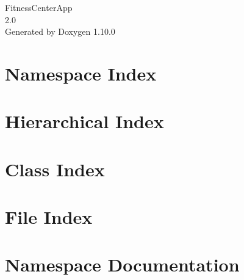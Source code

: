 \documentclass[twoside]{book}
\newcommand{\+}{\discretionary{\mbox{\scriptsize$\hookleftarrow$}}{}{}}
\newcommand{\clearemptydoublepage}{%
    \newpage{\pagestyle{empty}\cleardoublepage}%
  }
\begin{document}
  \raggedbottom
    \hypersetup{pageanchor=false,
                bookmarksnumbered=true,
                pdfencoding=unicode
               }
  \begin{titlepage}
  \vspace*{7cm}
  \begin{center}%
  {\Large Fitness\+Center\+App}\\
  [1ex]\large 2.\+0 \\
  \vspace*{1cm}
  {\large Generated by Doxygen 1.10.0}\\
  \end{center}
  \end{titlepage}
  \clearemptydoublepage
  \tableofcontents
  \clearemptydoublepage
  \hypersetup{pageanchor=true}
\chapter{Namespace Index}

\chapter{Hierarchical Index}

\chapter{Class Index}

\chapter{File Index}

\chapter{Namespace Documentation}
















\end{document}
